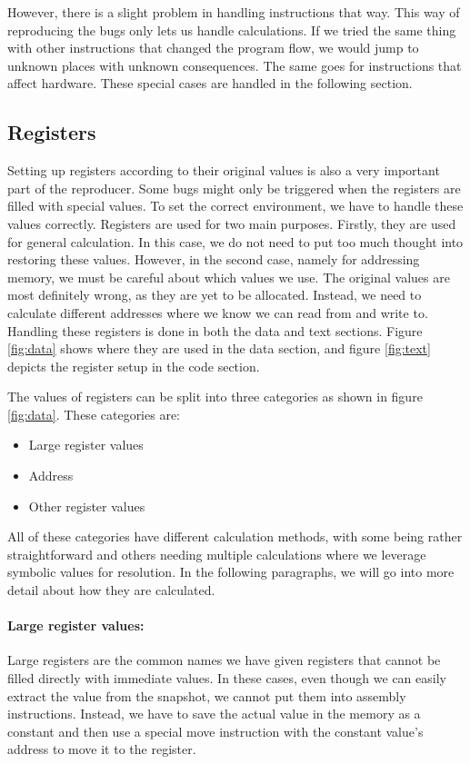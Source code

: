 However, there is a slight problem in handling instructions that way.
This way of reproducing the bugs only lets us handle calculations.
If we tried the same thing with other instructions that changed the program flow, we would jump to unknown places with unknown consequences.
The same goes for instructions that affect hardware.
These special cases are handled in the following section.

\subsection{Registers}
Setting up registers according to their original values is also a very important part of the reproducer.
Some bugs might only be triggered when the registers are filled with special values.
To set the correct environment, we have to handle these values correctly.
Registers are used for two main purposes.
Firstly, they are used for general calculation.
In this case, we do not need to put too much thought into restoring these values.
However, in the second case, namely for addressing memory, we must be careful about which values we use.
The original values are most definitely wrong, as they are yet to be allocated.
Instead, we need to calculate different addresses where we know we can read from and write to.
Handling these registers is done in both the data and text sections.
Figure \ref{fig:data} shows where they are used in the data section, and figure \ref{fig:text} depicts the register setup in the code section.

The values of registers can be split into three categories as shown in figure \ref{fig:data}.
These categories are:
\begin{itemize}
    \item Large register values
    \item Address
    \item Other register values
\end{itemize}
All of these categories have different calculation methods, with some being rather straightforward and others needing multiple calculations where we leverage symbolic values for resolution.
In the following paragraphs, we will go into more detail about how they are calculated.

\paragraph{Large register values:}
Large registers are the common names we have given registers that cannot be filled directly with immediate values.
In these cases, even though we can easily extract the value from the snapshot, we cannot put them into assembly instructions.
Instead, we have to save the actual value in the memory as a constant and then use a special move instruction with the constant value's address to move it to the register.

